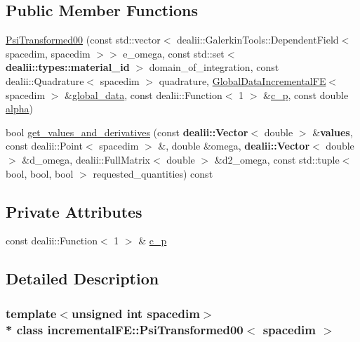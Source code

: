 \subsection*{Public Member Functions}
\begin{DoxyCompactItemize}
\item 
\hyperlink{classincremental_f_e_1_1_psi_transformed00_a93655112472546aa0d7da562bdc4c362}{Psi\+Transformed00} (const std\+::vector$<$ dealii\+::\+Galerkin\+Tools\+::\+Dependent\+Field$<$ spacedim, spacedim $>$$>$ e\+\_\+omega, const std\+::set$<$ {\bf dealii\+::types\+::material\+\_\+id} $>$ domain\+\_\+of\+\_\+integration, const dealii\+::\+Quadrature$<$ spacedim $>$ quadrature, \hyperlink{classincremental_f_e_1_1_global_data_incremental_f_e}{Global\+Data\+Incremental\+FE}$<$ spacedim $>$ \&\hyperlink{classincremental_f_e_1_1_psi_3_01spacedim_00_01spacedim_01_4_abf0a4804877fd7cc9bd1b90e52760ba9}{global\+\_\+data}, const dealii\+::\+Function$<$ 1 $>$ \&\hyperlink{classincremental_f_e_1_1_psi_transformed00_ac2839f6d588883ce362c51146d427671}{c\+\_\+p}, const double \hyperlink{classincremental_f_e_1_1_psi_3_01spacedim_00_01spacedim_01_4_af7b8227188dbdd6ada35b9445d96c79d}{alpha})
\item 
bool \hyperlink{classincremental_f_e_1_1_psi_transformed00_a38ef374a0d88d011c5f70bccec229afb}{get\+\_\+values\+\_\+and\+\_\+derivatives} (const {\bf dealii\+::\+Vector}$<$ double $>$ \&{\bf values}, const dealii\+::\+Point$<$ spacedim $>$ \&, double \&omega, {\bf dealii\+::\+Vector}$<$ double $>$ \&d\+\_\+omega, dealii\+::\+Full\+Matrix$<$ double $>$ \&d2\+\_\+omega, const std\+::tuple$<$ bool, bool, bool $>$ requested\+\_\+quantities) const 
\end{DoxyCompactItemize}
\subsection*{Private Attributes}
\begin{DoxyCompactItemize}
\item 
const dealii\+::\+Function$<$ 1 $>$ \& \hyperlink{classincremental_f_e_1_1_psi_transformed00_ac2839f6d588883ce362c51146d427671}{c\+\_\+p}
\end{DoxyCompactItemize}


\subsection{Detailed Description}
\subsubsection*{template$<$unsigned int spacedim$>$\\*
class incremental\+F\+E\+::\+Psi\+Transformed00$<$ spacedim $>$}

